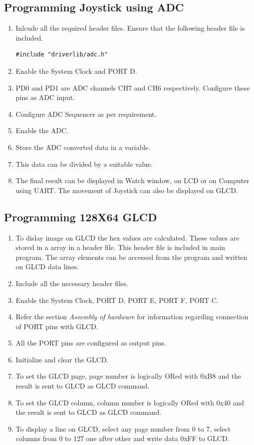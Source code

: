 \documentclass[a4paper,12pt,oneside]{book}
\begin{document}
\subsection{Programming Joystick using ADC}
\begin{enumerate}
\item Inlcude all the required header files. Ensure that the following header file is included.
\begin{lstlisting}
#include "driverlib/adc.h"
\end{lstlisting}
\item Enable the System Clock and PORT D.
\item PD0 and PD1 are ADC channels CH7 and CH6 respectively. Configure these pins as ADC input.
\item Configure ADC Sequencer as per requirement. 
\item Enable the ADC.
\item Store the ADC converted data in a variable.
\item This data can be divided by a suitable value. 
\item The final result can be displayed in Watch window, on LCD or on Computer using UART. The movement of Joystick can also be displayed on GLCD.
\end{enumerate}
\subsection{Programming 128X64 GLCD}
\begin{enumerate}
\item To dislay image on GLCD the hex values are calculated. These values are stored in a array in a header file. This header file is included in main program. The array elements can be accessed from the program and written on GLCD data lines.
\item Include all the necessary header files.
\item Enable the System Clock, PORT D, PORT E, PORT F, PORT C.
\item Refer the section \textit{Assembly of hardware} for information regarding connection of PORT pins with GLCD.
\item All the PORT pins are configured as output pins.
\item Initialize and clear the GLCD.
\item To set the GLCD page, page number is logically ORed with 0xB8 and the result is sent to GLCD as GLCD command.
\item To set the GLCD column, column number is logically ORed with 0x40 and the result is sent to GLCD as GLCD command.
\item To display a line on GLCD, select any page number from 0 to 7, select columns from 0 to 127 one after other and write data 0xFF to GLCD.
\end{enumerate}
\end{document}
